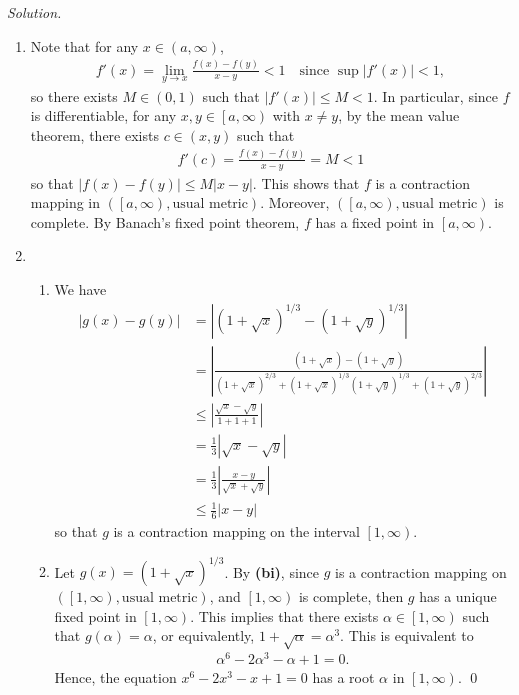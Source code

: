 \documentclass[11pt]{amsart}
\theoremstyle{plain}
\numberwithin{equation}{section}
\begin{document}
\noindent\emph{Solution.}
\begin{enumerate}[label=\textbf{(\alph*)}]
    \itemsep 0em
    \item Note that for any $x\in\left(a,\infty\right)$,
\begin{align*}
    f'(x)=\lim_{y\to x}\frac{f(x)-f(y)}{x-y}<1\quad\text{since }\sup\left|f'\left(x\right)\right|<1,
\end{align*}
so there exists $M\in(0,1)$ such that $\left|f'(x)\right|\leq M<1$. In particular, since $f$ is differentiable, for any $x,y\in\left[a,\infty\right)$ with $x\neq y$, by the mean value theorem, there exists $c\in(x,y)$ such that 
\begin{align*}
    f'(c)=\frac{f(x)-f(y)}{x-y}=M<1
\end{align*}
so that $\left|f(x)-f(y)\right|\leq M|x-y|$. This shows that $f$ is a contraction mapping in $\left(\left[a,\infty\right),\text{usual metric}\right)$. Moreover, $\left(\left[a,\infty\right),\text{usual metric}\right)$ is complete. By Banach's fixed point theorem, $f$ has a fixed point in $\left[a,\infty\right)$.
\item \begin{enumerate}[label=\textbf{(\roman*)}]
    \itemsep 0em
    \item We have
\begin{align*}
    \left|g(x)-g(y)\right|&=\left|\left(1+\sqrt{x}\right)^{1/3}-\left(1+\sqrt{y}\right)^{1/3}\right|
    \\
    &=\left|\frac{\left(1+\sqrt{x}\right)-\left(1+\sqrt{y}\right)}{\left(1+\sqrt{x}\right)^{2/3}+\left(1+\sqrt{x}\right)^{1/3}\left(1+\sqrt{y}\right)^{1/3}+\left(1+\sqrt{y}\right)^{2/3}}\right|
    \\
    &\leq\left|\frac{\sqrt{x}-\sqrt{y}}{1+1+1}\right|
    \\
    &=\frac{1}{3}\left|\sqrt{x}-\sqrt{y}\right|
    \\
    &=\frac{1}{3}\left|\frac{x-y}{\sqrt{x}+\sqrt{y}}\right|
    \\
    &\leq\frac{1}{6}|x-y|
\end{align*}
so that $g$ is a contraction mapping on the interval $\left[1,\infty\right)$.
\item Let $g(x)=\left(1+\sqrt{x}\right)^{1/3}$. By \textbf{(bi)}, since $g$ is a contraction mapping on $\left(\left[1,\infty\right),\text{usual metric}\right)$, and $\left[1,\infty\right)$ is complete, then $g$ has a unique fixed point in $\left[1,\infty\right)$. This implies that there exists $\alpha\in\left[1,\infty\right)$ such that $g\left(\alpha\right)=\alpha$, or equivalently, $1+\sqrt{\alpha}=\alpha^{3}$. This is equivalent to
\begin{align*}
    \alpha^{6}-2\alpha^{3}-\alpha+1=0.
\end{align*}
Hence, the equation $x^{6}-2x^{3}-x+1=0$ has a root $\alpha$ in $\left[1,\infty\right)$. \qed 
\end{enumerate}
\end{enumerate}
\end{document}
